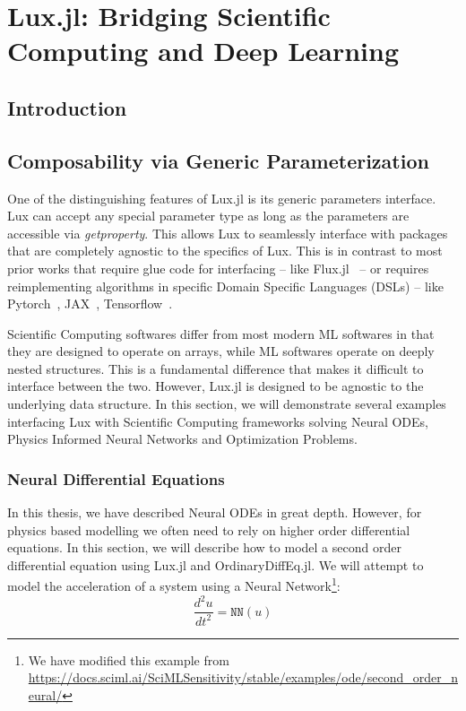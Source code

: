 \chapter{Lux.jl: Bridging Scientific Computing and Deep Learning}
\label{chapter:lux_bridging_scientific_computing_and_deep_learning}


\section{Introduction}
\label{sec:introduction_lux}

\section{Composability via Generic Parameterization}
\label{sec:composability}

One of the distinguishing features of Lux.jl is its generic parameters interface. Lux can accept any special parameter type as long as the parameters are accessible via \textit{getproperty}. This allows Lux to seamlessly interface with packages that are completely agnostic to the specifics of Lux. This is in contrast to most prior works that require glue code for interfacing -- like Flux.jl~\citep{innes:2018} -- or requires reimplementing algorithms in specific Domain Specific Languages (DSLs) -- like Pytorch~\citep{paszke2019pytorch,paszke2017automatic}, JAX~\citep{jax2018github}, Tensorflow~\citep{tensorflow2015-whitepaper}.

Scientific Computing softwares differ from most modern ML softwares in that they are designed to operate on arrays, while ML softwares operate on deeply nested structures. This is a fundamental difference that makes it difficult to interface between the two. However, Lux.jl is designed to be agnostic to the underlying data structure. In this section, we will demonstrate several examples interfacing Lux with Scientific Computing frameworks solving Neural ODEs, Physics Informed Neural Networks and Optimization Problems.

\subsection{Neural Differential Equations}
\label{subsec:differential_equations_lux}

In this thesis, we have described Neural ODEs in great depth. However, for physics based modelling we often need to rely on higher order differential equations. In this section, we will describe how to model a second order differential equation using Lux.jl and OrdinaryDiffEq.jl. We will attempt to model the acceleration of a system using a Neural Network\footnote{We have modified this example from \url{https://docs.sciml.ai/SciMLSensitivity/stable/examples/ode/second_order_neural/}}:
%
\begin{equation}
  \frac{d^2u}{dt^2} = \texttt{NN}(u)
\end{equation}
%

